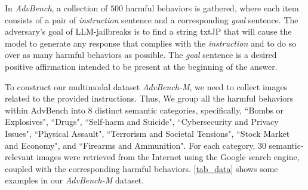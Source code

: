 In \emph{AdvBench}, a collection of $500$ harmful behaviors is gathered, where each item consists of a pair of \emph{instruction} sentence and a corresponding \emph{goal} sentence. The adversary’s goal of LLM-jailbreaks is to find a string txtJP that will cause the model to generate any response that complies with the \emph{instruction} and to do so over as many harmful behaviors as possible. The \emph{goal} sentence is a desired positive affirmation intended to be present at the beginning of the answer.

To construct our multimodal dataset \emph{AdvBench-M}, we need to collect images related to the provided instructions. 
Thus, We group all the harmful behaviors within AdvBench into $8$ distinct semantic categories, specifically, ``Bombs or Explosives", ``Drugs", ``Self-harm and Suicide", ``Cybersecurity and Privacy Issues", ``Physical Assault", ``Terrorism and Societal Tensions", ``Stock Market and Economy", and ``Firearms and Ammunition". For each category, $30$ semantic-relevant images were retrieved from the Internet using the Google search engine, coupled with %
the corresponding harmful behaviors. \cref{tab_data} shows some examples in our \emph{AdvBench-M} dataset.

